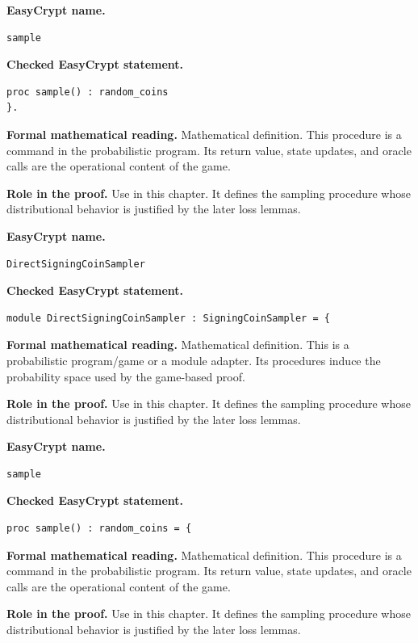 \begin{formaldefinition}
\noindent\textbf{EasyCrypt name.}
\begin{lstlisting}[language=EasyCrypt,basicstyle=\ttfamily\scriptsize]
sample
\end{lstlisting}
\noindent\textbf{Checked EasyCrypt statement.}
\begin{lstlisting}[language=EasyCrypt,basicstyle=\ttfamily\scriptsize]
proc sample() : random_coins
}.
\end{lstlisting}
\noindent\textbf{Formal mathematical reading.}
Mathematical definition. This procedure is a command in the probabilistic program.  Its return value, state updates, and oracle calls are the operational content of the game.

\noindent\textbf{Role in the proof.}
Use in this chapter. It defines the sampling procedure whose distributional behavior is justified by the later loss lemmas.

\end{formaldefinition}

\begin{formaldefinition}
\noindent\textbf{EasyCrypt name.}
\begin{lstlisting}[language=EasyCrypt,basicstyle=\ttfamily\scriptsize]
DirectSigningCoinSampler
\end{lstlisting}
\noindent\textbf{Checked EasyCrypt statement.}
\begin{lstlisting}[language=EasyCrypt,basicstyle=\ttfamily\scriptsize]
module DirectSigningCoinSampler : SigningCoinSampler = {
\end{lstlisting}
\noindent\textbf{Formal mathematical reading.}
Mathematical definition. This is a probabilistic program/game or a module adapter.  Its procedures induce the probability space used by the game-based proof.

\noindent\textbf{Role in the proof.}
Use in this chapter. It defines the sampling procedure whose distributional behavior is justified by the later loss lemmas.

\end{formaldefinition}

\begin{formaldefinition}
\noindent\textbf{EasyCrypt name.}
\begin{lstlisting}[language=EasyCrypt,basicstyle=\ttfamily\scriptsize]
sample
\end{lstlisting}
\noindent\textbf{Checked EasyCrypt statement.}
\begin{lstlisting}[language=EasyCrypt,basicstyle=\ttfamily\scriptsize]
proc sample() : random_coins = {
\end{lstlisting}
\noindent\textbf{Formal mathematical reading.}
Mathematical definition. This procedure is a command in the probabilistic program.  Its return value, state updates, and oracle calls are the operational content of the game.

\noindent\textbf{Role in the proof.}
Use in this chapter. It defines the sampling procedure whose distributional behavior is justified by the later loss lemmas.

\end{formaldefinition}

